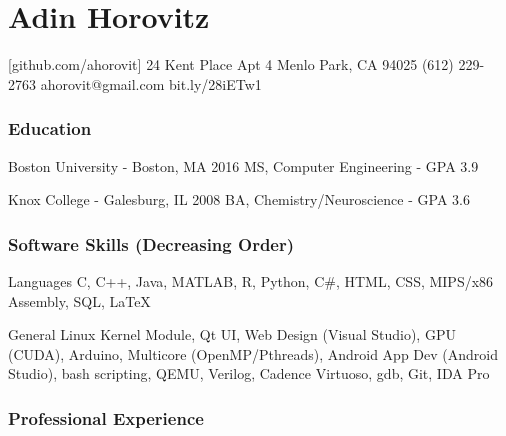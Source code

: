 \documentclass{tccv_AH}
\begin{document}
\sffamily

\part{Adin Horovitz}


\personal
    [github.com/ahorovit]
    {24 Kent Place Apt 4 \newline Menlo Park, CA 94025}
    {(612) 229-2763}
    {ahorovit@gmail.com}
    {bit.ly/28iETw1}



\section{Education}

\begin{yearlist}

\item[Boston University - Boston, MA]{2016}
     {MS, Computer Engineering - GPA 3.9}

\item[Knox College - Galesburg, IL]{2008}
     {BA, Chemistry/Neuroscience - GPA 3.6}

\end{yearlist}



\section{Software Skills \footnotesize{(Decreasing Order)}}

\begin{factlist}

\item{Languages}
     {C, C++, Java, MATLAB, R, Python, C\#, HTML, CSS, MIPS/x86 Assembly, SQL, \LaTeX}

\item{General}
     {Linux Kernel Module, Qt UI, Web Design (Visual Studio), GPU (CUDA), Arduino, Multicore (OpenMP/Pthreads), 
     Android App Dev (Android Studio), bash scripting, QEMU, Verilog, Cadence Virtuoso, gdb, Git, IDA Pro}

\end{factlist}



\section{Professional Experience}
\end{document}

